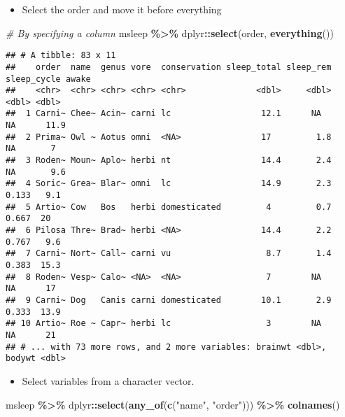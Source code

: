 \documentclass[
]{book}
\newenvironment{Shaded}{\begin{snugshade}}{\end{snugshade}}
\newcommand{\CommentTok}[1]{\textcolor[rgb]{0.56,0.35,0.01}{\textit{#1}}}
\newcommand{\KeywordTok}[1]{\textcolor[rgb]{0.13,0.29,0.53}{\textbf{#1}}}
\newcommand{\NormalTok}[1]{#1}
\newcommand{\OperatorTok}[1]{\textcolor[rgb]{0.81,0.36,0.00}{\textbf{#1}}}
\newcommand{\StringTok}[1]{\textcolor[rgb]{0.31,0.60,0.02}{#1}}
\providecommand{\tightlist}{%
  \setlength{\itemsep}{0pt}\setlength{\parskip}{0pt}}
\begin{document}
\begin{itemize}
\tightlist
\item
  Select the order and move it before everything
\end{itemize}

\begin{Shaded}
\begin{Highlighting}[]
\CommentTok{\# By specifying a column}
\NormalTok{msleep }\OperatorTok{\%\textgreater{}\%}
\StringTok{  }\NormalTok{dplyr}\OperatorTok{::}\KeywordTok{select}\NormalTok{(order, }\KeywordTok{everything}\NormalTok{())}
\end{Highlighting}
\end{Shaded}

\begin{verbatim}
## # A tibble: 83 x 11
##    order  name  genus vore  conservation sleep_total sleep_rem sleep_cycle awake
##    <chr>  <chr> <chr> <chr> <chr>              <dbl>     <dbl>       <dbl> <dbl>
##  1 Carni~ Chee~ Acin~ carni lc                  12.1      NA        NA      11.9
##  2 Prima~ Owl ~ Aotus omni  <NA>                17         1.8      NA       7  
##  3 Roden~ Moun~ Aplo~ herbi nt                  14.4       2.4      NA       9.6
##  4 Soric~ Grea~ Blar~ omni  lc                  14.9       2.3       0.133   9.1
##  5 Artio~ Cow   Bos   herbi domesticated         4         0.7       0.667  20  
##  6 Pilosa Thre~ Brad~ herbi <NA>                14.4       2.2       0.767   9.6
##  7 Carni~ Nort~ Call~ carni vu                   8.7       1.4       0.383  15.3
##  8 Roden~ Vesp~ Calo~ <NA>  <NA>                 7        NA        NA      17  
##  9 Carni~ Dog   Canis carni domesticated        10.1       2.9       0.333  13.9
## 10 Artio~ Roe ~ Capr~ herbi lc                   3        NA        NA      21  
## # ... with 73 more rows, and 2 more variables: brainwt <dbl>, bodywt <dbl>
\end{verbatim}

\begin{itemize}
\tightlist
\item
  Select variables from a character vector.
\end{itemize}

\begin{Shaded}
\begin{Highlighting}[]
\NormalTok{msleep }\OperatorTok{\%\textgreater{}\%}
\StringTok{  }\NormalTok{dplyr}\OperatorTok{::}\KeywordTok{select}\NormalTok{(}\KeywordTok{any\_of}\NormalTok{(}\KeywordTok{c}\NormalTok{(}\StringTok{"name"}\NormalTok{, }\StringTok{"order"}\NormalTok{))) }\OperatorTok{\%\textgreater{}\%}
\StringTok{  }\KeywordTok{colnames}\NormalTok{()}
\end{Highlighting}
\end{Shaded}
\end{document}
